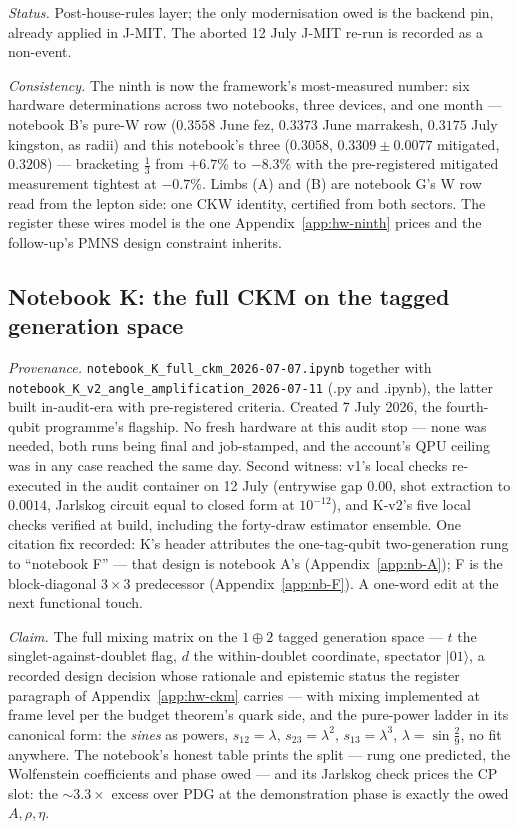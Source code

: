 \emph{Status.} Post-house-rules layer; the only modernisation owed is the backend pin, already
applied in J-MIT. The aborted 12 July J-MIT re-run is recorded as a non-event.

\emph{Consistency.} The ninth is now the framework's most-measured number: six hardware
determinations across two notebooks, three devices, and one month --- notebook B's pure-W row
($0.3558$ June fez, $0.3373$ June marrakesh, $0.3175$ July kingston, as radii) and this
notebook's three ($0.3058$, $0.3309 \pm 0.0077$ mitigated, $0.3208$) --- bracketing $\tfrac13$
from $+6.7\%$ to $-8.3\%$ with the pre-registered mitigated measurement tightest at $-0.7\%$.
Limbs (A) and (B) are notebook G's W row read from the lepton side: one CKW identity, certified
from both sectors. The register these wires model is the one Appendix~\ref{app:hw-ninth} prices
and the follow-up's PMNS design constraint inherits.

\subsection{Notebook K: the full CKM on the tagged generation space}
\label{app:nb-K}

\emph{Provenance.} \texttt{notebook\_K\_full\_ckm\_2026-07-07.ipynb} together with
\texttt{notebook\_K\_v2\_angle\_amplification\_2026-07-11} (.py and .ipynb), the latter built
in-audit-era with pre-registered criteria. Created 7 July 2026, the fourth-qubit programme's
flagship. No fresh hardware at this audit stop --- none was needed, both runs being final and
job-stamped, and the account's QPU ceiling was in any case reached the same day. Second witness:
v1's local checks re-executed in the audit container on 12 July (entrywise gap $0.00$, shot
extraction to $0.0014$, Jarlskog circuit equal to closed form at $10^{-12}$), and K-v2's five
local checks verified at build, including the forty-draw estimator ensemble. One citation fix
recorded: K's header attributes the one-tag-qubit two-generation rung to ``notebook F'' ---
that design is notebook A's (Appendix~\ref{app:nb-A}); F is the block-diagonal $3\times3$
predecessor (Appendix~\ref{app:nb-F}). A one-word edit at the next functional touch.

\emph{Claim.} The full mixing matrix on the $1 \oplus 2$ tagged generation space --- $t$ the
singlet-against-doublet flag, $d$ the within-doublet coordinate, spectator $\lvert01\rangle$, a
recorded design decision whose rationale and epistemic status the register paragraph of
Appendix~\ref{app:hw-ckm} carries --- with mixing implemented at frame level per the budget
theorem's quark side, and the pure-power ladder in its canonical form: the \emph{sines} as powers,
$s_{12} = \lambda$, $s_{23} = \lambda^{2}$, $s_{13} = \lambda^{3}$, $\lambda = \sin\tfrac29$, no
fit anywhere. The notebook's honest table prints the split --- rung one predicted, the
Wolfenstein coefficients and phase owed --- and its Jarlskog check prices the CP slot: the
$\sim3.3\times$ excess over PDG at the demonstration phase is exactly the owed $A, \rho, \eta$.

